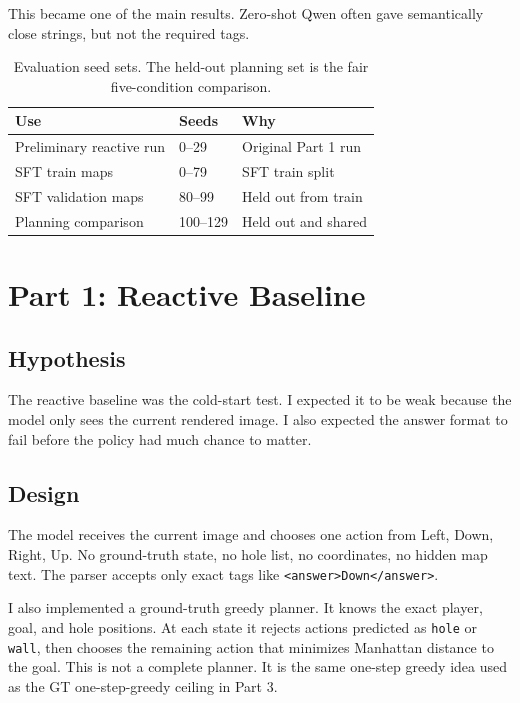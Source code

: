\documentclass{article}
\newcommand{\code}[1]{\texttt{#1}}
\begin{document}
This became one of the main results. Zero-shot Qwen often gave semantically close strings, but not the required tags.

\begin{table}[t]
\caption{Evaluation seed sets. The held-out planning set is the fair five-condition comparison.}
\label{tab:seedsets}
\centering
\small
\begin{tabular}{lll}
\toprule
Use & Seeds & Why \\
\midrule
Preliminary reactive run & 0--29 & Original Part 1 run \\
SFT train maps & 0--79 & SFT train split \\
SFT validation maps & 80--99 & Held out from train \\
Planning comparison & 100--129 & Held out and shared \\
\bottomrule
\end{tabular}
\end{table}

\section{Part 1: Reactive Baseline}

\subsection{Hypothesis}

The reactive baseline was the cold-start test. I expected it to be weak because the model only sees the current rendered image. I also expected the answer format to fail before the policy had much chance to matter.

\subsection{Design}

The model receives the current image and chooses one action from Left, Down, Right, Up. No ground-truth state, no hole list, no coordinates, no hidden map text. The parser accepts only exact tags like \code{<answer>Down</answer>}.

I also implemented a ground-truth greedy planner. It knows the exact player, goal, and hole positions. At each state it rejects actions predicted as \code{hole} or \code{wall}, then chooses the remaining action that minimizes Manhattan distance to the goal. This is not a complete planner. It is the same one-step greedy idea used as the GT one-step-greedy ceiling in Part 3.
\end{document}
